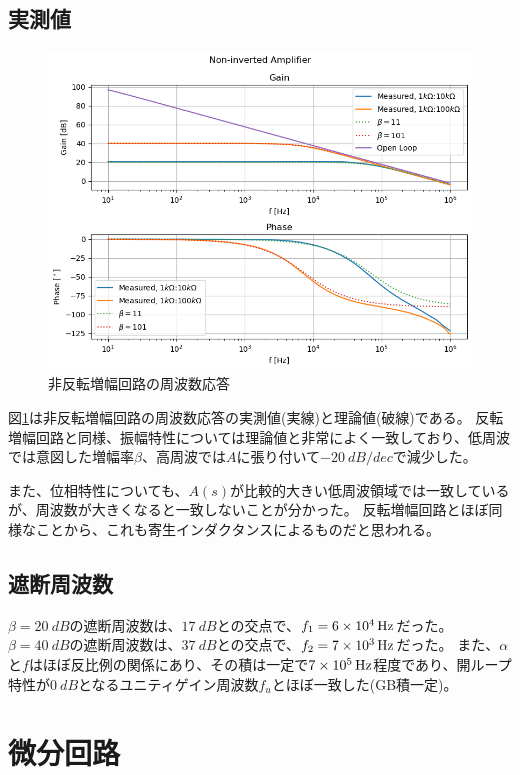 \documentclass[a4paper]{ltjsarticle}
\begin{document}
\subsection{実測値}
\begin{figure}[htbp]
    \centering
    \includegraphics[width=0.8\columnwidth]{./images/noninvertamp_bode.png}
    \caption{非反転増幅回路の周波数応答}
    \label{fig:noninvertamp_bode}
\end{figure}
図\ref{fig:noninvertamp_bode}は非反転増幅回路の周波数応答の実測値(実線)と理論値(破線)である。
反転増幅回路と同様、振幅特性については理論値と非常によく一致しており、低周波では意図した増幅率$\beta$、高周波では$A$に張り付いて$\SI{-20}{dB/dec}$で減少した。

また、位相特性についても、$A(s)$が比較的大きい低周波領域では一致しているが、周波数が大きくなると一致しないことが分かった。
反転増幅回路とほぼ同様なことから、これも寄生インダクタンスによるものだと思われる。

\subsection{遮断周波数}
$\beta=\SI{20}{dB}$の遮断周波数は、$\SI{17}{dB}$との交点で、$f_1=\SI{6E4}{Hz}$だった。
$\beta=\SI{40}{dB}$の遮断周波数は、$\SI{37}{dB}$との交点で、$f_2=\SI{7E3}{Hz}$だった。
また、$\alpha$と$f$はほぼ反比例の関係にあり、その積は一定で$\SI{7E5}{Hz}$程度であり、開ループ特性が$\SI{0}{dB}$となるユニティゲイン周波数$f_u$とほぼ一致した(GB積一定)。

\section{微分回路}
\end{document}

